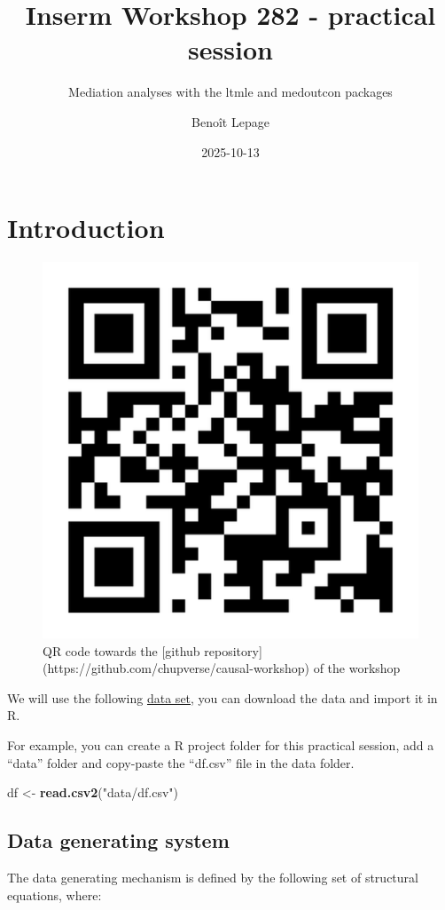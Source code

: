 \documentclass[
]{book}
\title{Inserm Workshop 282 - practical session}
\subtitle{Mediation analyses with the ltmle and medoutcon packages}
\author{Benoît Lepage}
\date{2025-10-13}
\newenvironment{Shaded}{\begin{snugshade}}{\end{snugshade}}
\newcommand{\FunctionTok}[1]{\textcolor[rgb]{0.13,0.29,0.53}{\textbf{#1}}}
\newcommand{\NormalTok}[1]{#1}
\newcommand{\OtherTok}[1]{\textcolor[rgb]{0.56,0.35,0.01}{#1}}
\newcommand{\StringTok}[1]{\textcolor[rgb]{0.31,0.60,0.02}{#1}}
\begin{document}
\maketitle

{
\setcounter{tocdepth}{1}
\tableofcontents
}
\chapter{Introduction}\label{introduction}

\begin{figure}

{\centering \includegraphics[width=0.3\linewidth]{./images/url} 

}

\caption{QR code towards the [github repository](https://github.com/chupverse/causal-workshop) of the workshop}\label{fig:qrcode}
\end{figure}

We will use the following \href{https://github.com/benoitlepage/Inserm_workshop_282/blob/main/data/df.csv}{data set}, you can download the data and import it in R.

For example, you can create a R project folder for this practical session, add a ``data'' folder and copy-paste the ``df.csv'' file in the data folder.

\begin{Shaded}
\begin{Highlighting}[]
\NormalTok{df }\OtherTok{\textless{}{-}} \FunctionTok{read.csv2}\NormalTok{(}\StringTok{"data/df.csv"}\NormalTok{)}
\end{Highlighting}
\end{Shaded}

\section{Data generating system}\label{data-generating-system}

The data generating mechanism is defined by the following set of structural equations, where:
\end{document}
